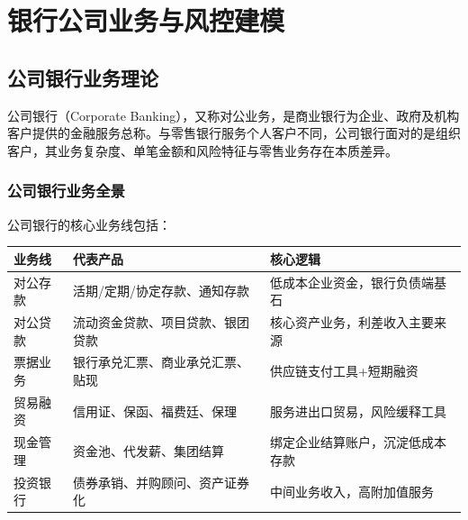 
\chapter{银行公司业务与风控建模}

\section{公司银行业务理论}

公司银行（Corporate Banking），又称对公业务，是商业银行为企业、政府及机构客户提供的金融服务总称。与零售银行服务个人客户不同，公司银行面对的是组织客户，其业务复杂度、单笔金额和风险特征与零售业务存在本质差异。

\subsection{公司银行业务全景}

公司银行的核心业务线包括：

\begin{table}[H]
\centering
\begin{tabular}{lp{3.5cm}p{5.5cm}}
\toprule
\textbf{业务线} & \textbf{代表产品} & \textbf{核心逻辑} \\
\midrule
对公存款 & 活期/定期/协定存款、通知存款 & 低成本企业资金，银行负债端基石 \\
对公贷款 & 流动资金贷款、项目贷款、银团贷款 & 核心资产业务，利差收入主要来源 \\
票据业务 & 银行承兑汇票、商业承兑汇票、贴现 & 供应链支付工具+短期融资 \\
贸易融资 & 信用证、保函、福费廷、保理 & 服务进出口贸易，风险缓释工具 \\
现金管理 & 资金池、代发薪、集团结算 & 绑定企业结算账户，沉淀低成本存款 \\
投资银行 & 债券承销、并购顾问、资产证券化 & 中间业务收入，高附加值服务 \\
\bottomrule
\end{tabular}
\end{table}

